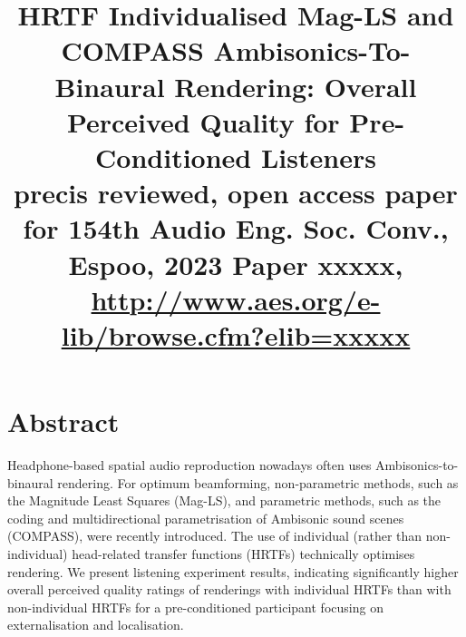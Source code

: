 \documentclass[conference]{IEEEtran}
\begin{document}
\title{HRTF Individualised Mag-LS and COMPASS Ambisonics-To-Binaural Rendering:
Overall Perceived Quality for Pre-Conditioned Listeners\\
{\footnotesize precis reviewed, open access paper for 154th
Audio Eng. Soc. Conv., Espoo, 2023
Paper xxxxx, \url{http://www.aes.org/e-lib/browse.cfm?elib=xxxxx}}}
\author{
}
\maketitle
\thispagestyle{plain}
\pagestyle{plain}

\section*{Abstract}
Headphone-based spatial audio reproduction nowadays often uses Ambisonics-to-binaural rendering.
%
For optimum beamforming, non-parametric methods, such as the Magnitude Least Squares (Mag-LS), and parametric methods, such as the coding and multidirectional parametrisation of Ambisonic sound scenes (COMPASS), were recently introduced.
%
The use of individual (rather than non-individual) head-related transfer functions (HRTFs) technically optimises rendering.
%
We present listening experiment results, indicating significantly higher overall perceived quality ratings of renderings with individual HRTFs than with non-individual HRTFs for a pre-conditioned participant focusing on externalisation and localisation.
\end{document}
